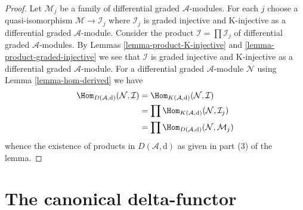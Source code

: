 \begin{proof}
\medskip\noindent
Let $\mathcal{M}_j$ be a family of differential graded $\mathcal{A}$-modules.
For each $j$ choose a quasi-isomorphism
$\mathcal{M} \to \mathcal{I}_j$ where
$\mathcal{I}_j$ is graded injective and K-injective as a
differential graded $\mathcal{A}$-module.
Consider the product $\mathcal{I} = \prod \mathcal{I}_j$
of differential graded $\mathcal{A}$-modules.
By Lemmas \ref{lemma-product-K-injective} and
\ref{lemma-product-graded-injective} we see that
$\mathcal{I}$ is graded injective and K-injective as a
differential graded $\mathcal{A}$-module.
For a differential graded $\mathcal{A}$-module
$\mathcal{N}$ using Lemma \ref{lemma-hom-derived} we have
\begin{align*}
\Hom_{D(\mathcal{A}, \text{d})}(\mathcal{N}, \mathcal{I})
& =
\Hom_{K(\mathcal{A}, \text{d})}(\mathcal{N}, \mathcal{I}) \\
& =
\prod \Hom_{K(\mathcal{A}, \text{d})}(\mathcal{N}, \mathcal{I}_j) \\
& =
\prod \Hom_{D(\mathcal{A}, \text{d})}(\mathcal{N}, \mathcal{M}_j)
\end{align*}
whence the existence of products in $D(\mathcal{A}, \text{d})$ as given in
part (3) of the lemma.
\end{proof}







\section{The canonical delta-functor}
\label{section-canonical-delta-functor}

